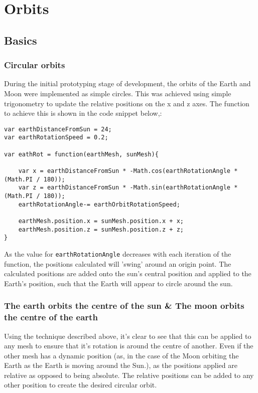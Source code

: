 \documentclass[titlepage]{article}
\begin{document}
\section{Orbits}

\subsection{Basics}
\subsubsection{Circular orbits}
During the initial prototyping stage of development, the orbits of the Earth and Moon were implemented as simple circles. This was achieved using simple trigonometry to update the relative positions on the x and z axes. The function to achieve this is shown in the code snippet below,:

\begin{lstlisting}[caption=Simple orbit calculation]
var earthDistanceFromSun = 24;
var earthRotationSpeed = 0.2;

var eathRot = function(earthMesh, sunMesh){
    
    var x = earthDistanceFromSun * -Math.cos(earthRotationAngle * (Math.PI / 180));
    var z = earthDistanceFromSun * -Math.sin(earthRotationAngle * (Math.PI / 180));
    earthRotationAngle-= earthOrbitRotationSpeed;
    
    earthMesh.position.x = sunMesh.position.x + x;
    earthMesh.position.z = sunMesh.position.z + z;
}

\end{lstlisting}

As the value for \texttt{earthRotationAngle} decreases with each iteration of the function, the positions calculated will 'swing' around an origin point. The calculated positions are added onto the sun's central position and applied to the Earth's position, such that the Earth will appear to circle around the sun.

\subsubsection{The earth orbits the centre of the sun \& The moon orbits the centre of the earth}
Using the technique described above, it's clear to see that this can be applied to any mesh to ensure that it's rotation is around the centre of another. Even if the other mesh has a dynamic position (as, in the case of the Moon orbiting the Earth as the Earth is moving around the Sun.), as the positions applied are relative as opposed to being absolute. The relative positions can be added to any other position to create the desired circular orbit.
 
\end{document}
